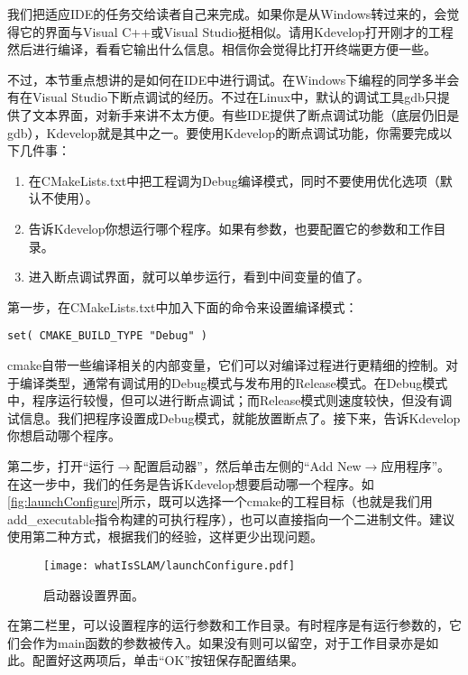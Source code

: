 我们把适应IDE的任务交给读者自己来完成。如果你是从Windows转过来的，会觉得它的界面与Visual C++或Visual Studio挺相似。请用Kdevelop打开刚才的工程然后进行编译，看看它输出什么信息。相信你会觉得比打开终端更方便一些。

不过，本节重点想讲的是如何在IDE中进行调试。在Windows下编程的同学多半会有在Visual Studio下断点调试的经历。不过在Linux中，默认的调试工具gdb只提供了文本界面，对新手来讲不太方便。有些IDE提供了断点调试功能（底层仍旧是gdb），Kdevelop就是其中之一。要使用Kdevelop的断点调试功能，你需要完成以下几件事：

\begin{enumerate}
	\item 在CMakeLists.txt中把工程调为Debug编译模式，同时不要使用优化选项（默认不使用）。
	\item 告诉Kdevelop你想运行哪个程序。如果有参数，也要配置它的参数和工作目录。
	\item 进入断点调试界面，就可以单步运行，看到中间变量的值了。
\end{enumerate}


第一步，在CMakeLists.txt中加入下面的命令来设置编译模式：
\begin{lstlisting}[caption=slambook2/ch2/CMakeLists.txt]
set( CMAKE_BUILD_TYPE "Debug" )
\end{lstlisting}

cmake自带一些编译相关的内部变量，它们可以对编译过程进行更精细的控制。对于编译类型，通常有调试用的Debug模式与发布用的Release模式。在Debug模式中，程序运行较慢，但可以进行断点调试；而Release模式则速度较快，但没有调试信息。我们把程序设置成Debug模式，就能放置断点了。接下来，告诉Kdevelop你想启动哪个程序。

第二步，打开“运行$\rightarrow$配置启动器”，然后单击左侧的“Add New$\rightarrow$应用程序”。在这一步中，我们的任务是告诉Kdevelop想要启动哪一个程序。如\autoref{fig:launchConfigure}所示，既可以选择一个cmake的工程目标（也就是我们用add_executable指令构建的可执行程序），也可以直接指向一个二进制文件。建议使用第二种方式，根据我们的经验，这样更少出现问题。

\begin{figure}[!ht]
	\centering
	\texttt{[image: whatIsSLAM/launchConfigure.pdf]}
	\caption{启动器设置界面。}
	\label{fig:launchConfigure}
\end{figure}

在第二栏里，可以设置程序的运行参数和工作目录。有时程序是有运行参数的，它们会作为main函数的参数被传入。如果没有则可以留空，对于工作目录亦是如此。配置好这两项后，单击“OK”按钮保存配置结果。

